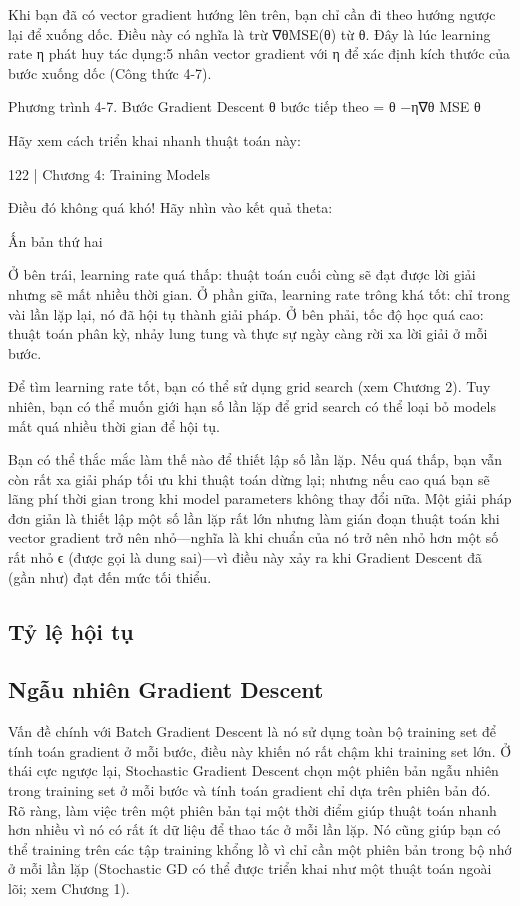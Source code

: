 Khi bạn đã có vector gradient hướng lên trên, bạn chỉ cần đi theo hướng ngược lại để xuống dốc. Điều này có nghĩa là trừ ∇θMSE(θ) từ θ. Đây là lúc learning rate η phát huy tác dụng:5 nhân vector gradient với η để xác định kích thước của bước xuống dốc (Công thức 4-7).

Phương trình 4-7. Bước Gradient Descent θ bước tiếp theo = θ −η∇θ MSE θ

Hãy xem cách triển khai nhanh thuật toán này:

122 | Chương 4: Training Models

Điều đó không quá khó! Hãy nhìn vào kết quả theta:

Ấn bản thứ hai

Ở bên trái, learning rate quá thấp: thuật toán cuối cùng sẽ đạt được lời giải nhưng sẽ mất nhiều thời gian. Ở phần giữa, learning rate trông khá tốt: chỉ trong vài lần lặp lại, nó đã hội tụ thành giải pháp. Ở bên phải, tốc độ học quá cao: thuật toán phân kỳ, nhảy lung tung và thực sự ngày càng rời xa lời giải ở mỗi bước.

Để tìm learning rate tốt, bạn có thể sử dụng grid search (xem Chương 2). Tuy nhiên, bạn có thể muốn giới hạn số lần lặp để grid search có thể loại bỏ models mất quá nhiều thời gian để hội tụ.

Bạn có thể thắc mắc làm thế nào để thiết lập số lần lặp. Nếu quá thấp, bạn vẫn còn rất xa giải pháp tối ưu khi thuật toán dừng lại; nhưng nếu cao quá bạn sẽ lãng phí thời gian trong khi model parameters không thay đổi nữa. Một giải pháp đơn giản là thiết lập một số lần lặp rất lớn nhưng làm gián đoạn thuật toán khi vector gradient trở nên nhỏ—nghĩa là khi chuẩn của nó trở nên nhỏ hơn một số rất nhỏ ϵ (được gọi là dung sai)—vì điều này xảy ra khi Gradient Descent đã (gần như) đạt đến mức tối thiểu.

\subsection{Tỷ lệ hội tụ}

\subsection{Ngẫu nhiên Gradient Descent}

Vấn đề chính với Batch Gradient Descent là nó sử dụng toàn bộ training set để tính toán gradient ở mỗi bước, điều này khiến nó rất chậm khi training set lớn. Ở thái cực ngược lại, Stochastic Gradient Descent chọn một phiên bản ngẫu nhiên trong training set ở mỗi bước và tính toán gradient chỉ dựa trên phiên bản đó. Rõ ràng, làm việc trên một phiên bản tại một thời điểm giúp thuật toán nhanh hơn nhiều vì nó có rất ít dữ liệu để thao tác ở mỗi lần lặp. Nó cũng giúp bạn có thể training trên các tập training khổng lồ vì chỉ cần một phiên bản trong bộ nhớ ở mỗi lần lặp (Stochastic GD có thể được triển khai như một thuật toán ngoài lõi; xem Chương 1).

